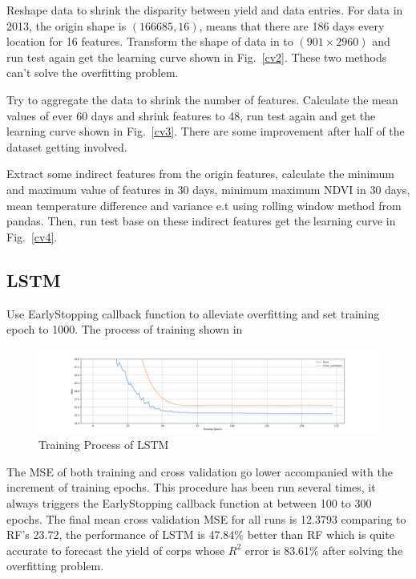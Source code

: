 \documentclass[conference]{IEEEtran}
\begin{document}
Reshape data to shrink the disparity between yield and data entries. For data in 2013, the origin shape is $(166685,16)$, means that there are 186 days every location for 16 features. Transform the shape of data in to $(901\times2960)$ and run test again get the learning curve shown in Fig.~\ref{cv2}. These two methods can't solve the overfitting problem.

Try to aggregate the data to shrink the number of features. Calculate the mean values of ever 60 days and shrink features to 48, run test again and get the learning curve shown in Fig.~\ref{cv3}. There are some improvement after half of the dataset getting involved.

Extract some indirect features from the origin features, calculate the minimum and maximum value of features in 30 days, minimum maximum NDVI in 30 days, mean temperature difference and variance e.t using rolling window method from pandas. Then, run test base on these indirect features get the learning curve in Fig.~\ref{cv4}.

\subsection{LSTM}
Use EarlyStopping callback function to alleviate overfitting and set training epoch to 1000. The process of training shown in %

\begin{figure}[htbp]
  \centerline{\includegraphics[width=\linewidth]{figures/lp.png}}
  \caption{Training Process of LSTM}
  \label{fig:train}
\end{figure}

The MSE of both training and cross validation go lower accompanied with the increment of training epochs. This procedure has been run several times, it always triggers the EarlyStopping callback function at between 100 to 300 epochs. The final mean cross validation MSE for all runs is 12.3793 comparing to RF's 23.72, the performance of LSTM is 47.84\% better than RF which is quite accurate to forecast the yield of corps whose $R^2$ error is 83.61\% after solving the overfitting problem.
\end{document}
